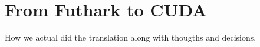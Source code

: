 \section{From Futhark to CUDA}

How we actual did the translation along with thougths and
decisions.
